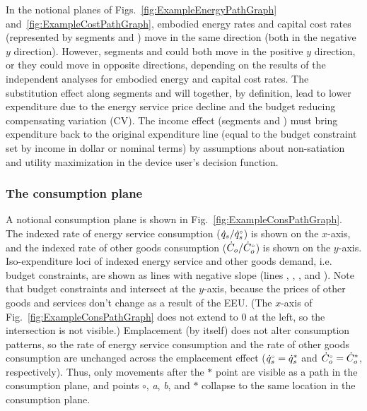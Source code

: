 \documentclass[12pt]{article}\usepackage[]{graphicx}\usepackage[]{xcolor}
\begin{document}
In the notional planes of
Figs.~\ref{fig:ExampleEnergyPathGraph} and~\ref{fig:ExampleCostPathGraph}, 
embodied energy rates and capital cost rates
(represented by segments \ab{} and \bstar{}) 
move in the same direction (both in the negative $y$ direction).
However, segments \ab{} and \bstar{} 
could both move in the positive $y$ direction, or
they could move in opposite directions, 
depending on the results of the independent analyses for 
embodied energy and capital cost rates.
The substitution effect along segments \starc{} and \chat{}
will together, by definition, lead to lower expenditure 
due to the energy service price decline and
the budget reducing compensating variation (CV). 
The income effect (segments \hatd{} and \dbar{}) must bring expenditure
back to the original expenditure line 
(equal to the budget constraint set by income in dollar or nominal terms) 
by assumptions about non-satiation and utility maximization 
in the device user's decision function.


\subsubsection{The consumption plane}
\label{sec:consumption_path_graphs}

A notional consumption plane is shown in Fig.~\ref{fig:ExampleConsPathGraph}.
The indexed rate of energy service consumption ($\dot{q}_s/{}{\dot{q}}^{\scriptscriptstyle \circ}_s$) is shown on the $x$-axis, and
the indexed rate of other goods consumption ($\dot{C}_o/{}{\dot{C}}^{\scriptscriptstyle \circ}_o$) is shown on the $y$-axis.
Iso-expenditure loci of indexed energy service and other goods demand,
i.e. budget constraints,
are shown as lines with negative slope
(lines \circcirc{}, \starstar{}, \hathat{}, and \barbar{}). 
Note that budget constraints \circcirc{} and \barbar{} 
intersect at the $y$-axis,
because the prices of other goods and services don't change
as a result of the EEU.
(The $x$-axis of Fig.~\ref{fig:ExampleConsPathGraph} does not extend to $0$ at the left, 
so the intersection is not visible.)
Emplacement (by itself) does not alter consumption patterns, so
the rate of energy service consumption and 
the rate of other goods consumption are
unchanged across the emplacement effect
(${}{\dot{q}}^{\scriptscriptstyle \circ}_s = {\dot{q}}^*_s$ and ${}{\dot{C}}^{\scriptscriptstyle \circ}_o = {\dot{C}}^*_o$, respectively).
Thus, 
only movements after the $*$ point are visible as a path in the consumption plane, and
points $\circ$, \emph{a}, \emph{b}, and $*$ 
collapse to the same location in the consumption plane.
\end{document}
